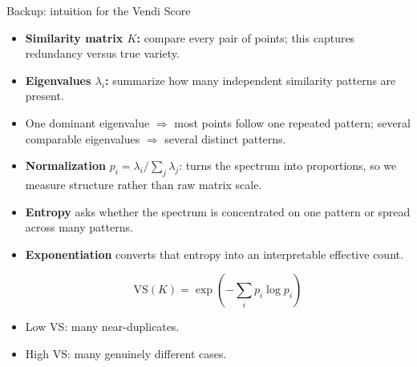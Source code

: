 \begin{frame}[noframenumbering]{Backup: intuition for the Vendi Score}
	\small
	\begin{itemize}
		\footnotesize
		\setlength\itemsep{0.18em}
		\item \textbf{Similarity matrix \(K\):} compare every pair of points; this captures redundancy versus true variety.
		\item \textbf{Eigenvalues \(\lambda_i\):} summarize how many independent similarity patterns are present.
		\item One dominant eigenvalue \(\Rightarrow\) most points follow one repeated pattern; several comparable eigenvalues \(\Rightarrow\) several distinct patterns.
		\item \textbf{Normalization} \(p_i = \lambda_i / \sum_j \lambda_j\): turns the spectrum into proportions, so we measure structure rather than raw matrix scale.
		\item \textbf{Entropy} asks whether the spectrum is concentrated on one pattern or spread across many patterns.
		\item \textbf{Exponentiation} converts that entropy into an interpretable effective count.

		      \[
			      \mathrm{VS}(K)=\exp\!\left(-\sum_i p_i \log p_i\right)
		      \]

		\item Low VS: many near-duplicates.
		\item High VS: many genuinely different cases.
	\end{itemize}
\end{frame}

